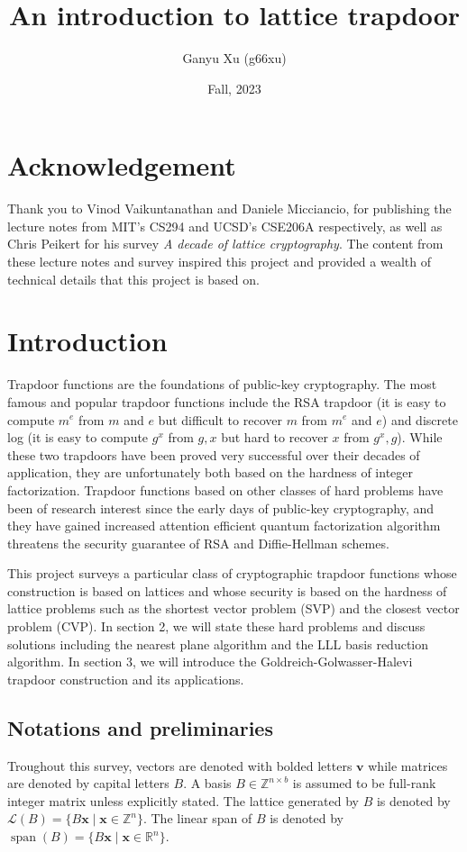 \documentclass[letterpaper,12pt]{article}
\title{An introduction to lattice trapdoor}
\author{Ganyu Xu (g66xu)}
\date{Fall, 2023}
\begin{document}
\maketitle

\section*{Acknowledgement}
Thank you to Vinod Vaikuntanathan\cite{mit-cs294} and Daniele Micciancio\cite{ucsd-cse206a}, for publishing the lecture notes from MIT's CS294 and UCSD's CSE206A respectively, as well as Chris Peikert\cite{peikert2016decade} for his survey \textit{A decade of lattice cryptography}. The content from these lecture notes and survey inspired this project and provided a wealth of technical details that this project is based on.

\section{Introduction}
Trapdoor functions are the foundations of public-key cryptography. The most famous and popular trapdoor functions include the RSA trapdoor (it is easy to compute $m^e$ from $m$ and $e$ but difficult to recover $m$ from $m^e$ and $e$) and discrete log (it is easy to compute $g^x$ from $g, x$ but hard to recover $x$ from $g^x, g$). While these two trapdoors have been proved very successful over their decades of application, they are unfortunately both based on the hardness of integer factorization. Trapdoor functions based on other classes of hard problems have been of research interest since the early days of public-key cryptography, and they have gained increased attention efficient quantum factorization algorithm threatens the security guarantee of RSA and Diffie-Hellman schemes.

This project surveys a particular class of cryptographic trapdoor functions whose construction is based on lattices and whose security is based on the hardness of lattice problems such as the shortest vector problem (SVP) and the closest vector problem (CVP). In section 2, we will state these hard problems and discuss solutions including the nearest plane algorithm and the LLL basis reduction algorithm. In section 3, we will introduce the Goldreich-Golwasser-Halevi trapdoor construction and its applications.

\subsection{Notations and preliminaries}
Troughout this survey, vectors are denoted with bolded letters $\mathbf{v}$ while matrices are denoted by capital letters $B$. A basis $B \in \mathbb{Z}^{n \times b}$ is assumed to be full-rank integer matrix unless explicitly stated. The lattice generated by $B$ is denoted by $\mathcal{L}(B) = \{B\mathbf{x} \mid \mathbf{x} \in \mathbb{Z}^n \}$. The linear span of $B$ is denoted by $\operatorname{span}(B) = \{B\mathbf{x} \mid \mathbf{x} \in \mathbb{R}^n \}$.
\end{document}
